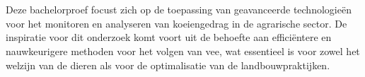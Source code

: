
%
%
%
%
%

%



\chapter*{}

Deze bachelorproef focust zich op de toepassing van geavanceerde technologieën voor het monitoren en analyseren van koeiengedrag in de agrarische sector. De inspiratie voor dit onderzoek komt voort uit de behoefte aan efficiëntere en nauwkeurigere methoden voor het volgen van vee, wat essentieel is voor zowel het welzijn van de dieren als voor de optimalisatie van de landbouwpraktijken.

